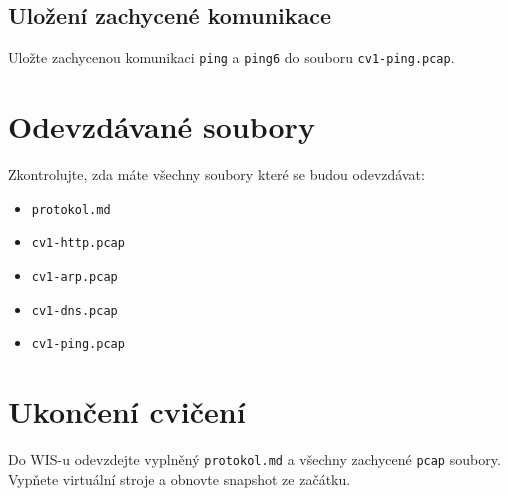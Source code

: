 \subsection*{Uložení zachycené komunikace}
Uložte zachycenou komunikaci \texttt{ping} a \texttt{ping6} do souboru \texttt{cv1-ping.pcap}.

\section*{Odevzdávané soubory}
Zkontrolujte, zda máte všechny soubory které se budou odevzdávat:
\begin{itemize}
  \item \texttt{protokol.md}
  \item \texttt{cv1-http.pcap}
  \item \texttt{cv1-arp.pcap}
  \item \texttt{cv1-dns.pcap}
  \item \texttt{cv1-ping.pcap}
\end{itemize}

\section{Ukončení cvičení}
Do WIS-u odevzdejte vyplněný \texttt{protokol.md} a všechny zachycené \texttt{pcap} soubory.
Vypňete virtuální stroje a obnovte snapshot ze začátku.

